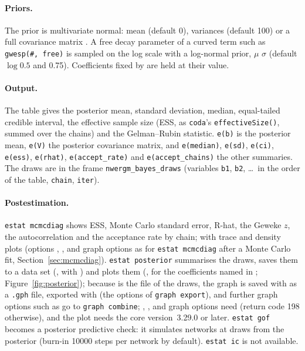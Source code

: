 \paragraph{Priors.} The prior is multivariate normal: mean  (default 0), variances  (default 100) or a full covariance matrix . A free decay parameter of a curved term such as \texttt{gwesp(\#, free)} is sampled on the log scale with a log-normal prior, $\mu$ $\sigma$\opt{)} (default $\log 0.5$ and 0.75). Coefficients fixed by  are held at their value.

\paragraph{Output.} The table gives the posterior mean, standard deviation, median, equal-tailed credible interval, the effective sample size (ESS, as \texttt{coda}'s \texttt{effectiveSize()}, summed over the chains) and the Gelman--Rubin statistic. \texttt{e(b)} is the posterior mean, \texttt{e(V)} the posterior covariance matrix, and \texttt{e(median)}, \texttt{e(sd)}, \texttt{e(ci)}, \texttt{e(ess)}, \texttt{e(rhat)}, \texttt{e(accept\_rate)} and \texttt{e(accept\_chains)} the other summaries. The draws are in the frame \texttt{nwergm\_bayes\_draws} (variables \texttt{b1}, \texttt{b2}, \dots\ in the order of the table, \texttt{chain}, \texttt{iter}).

\paragraph{Postestimation.} \texttt{estat mcmcdiag} shows ESS, Monte Carlo standard error, R-hat, the Geweke $z$, the autocorrelation and the acceptance rate by chain; with  trace and density plots (options , ,  and graph options as for \texttt{estat mcmcdiag} after a Monte Carlo fit, Section~\ref{sec:mcmcdiag}). \texttt{estat posterior} summarises the draws, saves them to a data set (, with ) and plots them (, for the coefficients named in ; Figure~\ref{fig:posterior}); because  is the file of the draws, the graph is saved with  as a \texttt{.gph} file, exported with  (the options of \texttt{graph export}), and further graph options such as  go to \texttt{graph combine}; , ,  and graph options need  (return code 198 otherwise), and the plot needs the core version~3.29.0 or later. \texttt{estat gof} becomes a posterior predictive check: it simulates networks at draws from the posterior (burn-in 10000 steps per network by default). \texttt{estat ic} is not available.

